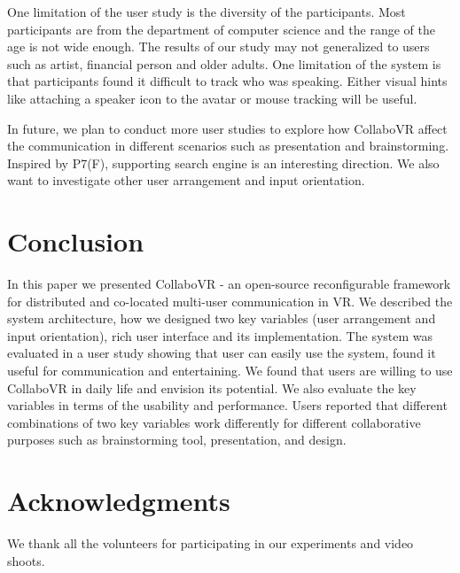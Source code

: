 \documentclass{sigchi}
\begin{document}
One limitation of the user study is the diversity of the participants. Most participants are from the department of computer science and the range of the age is not wide enough. The results of our study may not generalized to users such as artist, financial person and older adults. One limitation of the system is that participants found it difficult to track who was speaking. Either visual hints like attaching a speaker icon to the avatar or mouse tracking will be useful.

In future, we plan to conduct more user studies to explore how CollaboVR affect the communication in different scenarios such as presentation and brainstorming. Inspired by P7(F), supporting search engine is an interesting direction. We also want to investigate other user arrangement and input orientation.

\section{Conclusion}
In this paper we presented CollaboVR - an open-source reconfigurable framework for distributed and co-located multi-user communication in VR. We described the system architecture, how we designed two key variables (user arrangement and input orientation), rich user interface and its implementation. The system was evaluated in a user study showing that user can easily use the system, found it useful for communication and entertaining. We found that users are willing to use CollaboVR in daily life and envision its potential. We also evaluate the key variables in terms of the usability and performance. Users reported that different combinations of two key variables work differently for different collaborative purposes such as brainstorming tool, presentation, and design.

\section{Acknowledgments}
We thank all the volunteers for participating in our experiments and video shoots.

\end{document}
